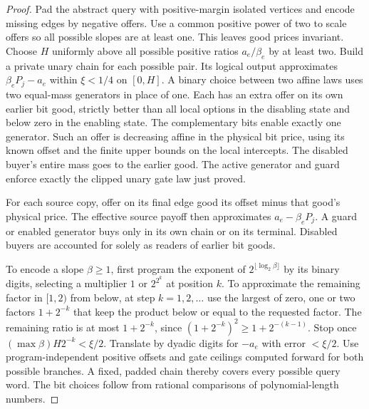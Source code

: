 \documentclass[11pt]{article}
\begin{document}
\begin{proof}
Pad the abstract query with positive-margin isolated vertices and encode
missing edges by negative offers. Use a common positive power of two
to scale offers so all possible slopes are at least one. This leaves
good prices invariant. Choose \(H\) uniformly above all possible positive
ratios \(a_e/\beta_e\) by at least two. Build a private unary chain for
each possible pair. Its logical output approximates
\(\beta_eP_j-a_e\) within \(\xi<1/4\) on \([0,H]\). A binary choice
between two affine laws uses two equal-mass generators in place of one.
Each has an extra offer on its own earlier bit good, strictly better than
all local options in the disabling state and below zero in the enabling
state. The complementary bits enable exactly one generator. Such an
offer is decreasing affine in the physical bit price, using its known
offset and the finite upper bounds on the local intercepts. The disabled
buyer's entire mass goes to the earlier good. The active generator and
guard enforce exactly the clipped unary gate law just proved.

For each source copy, offer on its final edge good its offset minus that
good's physical price. The effective source payoff then approximates
\(a_e-\beta_eP_j\). A guard or enabled generator buys only in its own
chain or on its terminal. Disabled buyers are accounted for solely as
readers of earlier bit goods.

To encode a slope \(\beta\ge1\), first program the exponent of
\(2^{\lfloor\log_2\beta\rfloor}\) by its binary digits, selecting a
multiplier \(1\) or \(2^{2^k}\) at position \(k\). To approximate the
remaining factor in \([1,2)\) from below, at step \(k=1,2,\ldots\)
use the largest of zero, one or two factors \(1+2^{-k}\) that keep
the product below or equal to the requested factor. The remaining ratio
is at most \(1+2^{-k}\), since
\((1+2^{-k})^2\ge1+2^{-(k-1)}\). Stop once
\((\max\beta)H2^{-k}<\xi/2\). Translate by dyadic digits for \(-a_e\)
with error \(<\xi/2\). Use program-independent positive offsets and gate
ceilings computed forward for both possible branches. A fixed, padded
chain thereby covers every possible query word. The bit choices follow
from rational comparisons of polynomial-length numbers.


\end{proof}
\end{document}
